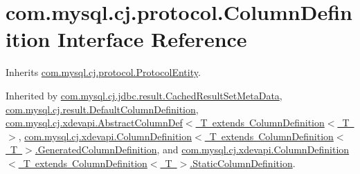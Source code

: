 \hypertarget{interfacecom_1_1mysql_1_1cj_1_1protocol_1_1_column_definition}{}\section{com.\+mysql.\+cj.\+protocol.\+Column\+Definition Interface Reference}
\label{interfacecom_1_1mysql_1_1cj_1_1protocol_1_1_column_definition}


Inherits \mbox{\hyperlink{interfacecom_1_1mysql_1_1cj_1_1protocol_1_1_protocol_entity}{com.\+mysql.\+cj.\+protocol.\+Protocol\+Entity}}.



Inherited by \mbox{\hyperlink{interfacecom_1_1mysql_1_1cj_1_1jdbc_1_1result_1_1_cached_result_set_meta_data}{com.\+mysql.\+cj.\+jdbc.\+result.\+Cached\+Result\+Set\+Meta\+Data}}, \mbox{\hyperlink{classcom_1_1mysql_1_1cj_1_1result_1_1_default_column_definition}{com.\+mysql.\+cj.\+result.\+Default\+Column\+Definition}}, \mbox{\hyperlink{classcom_1_1mysql_1_1cj_1_1xdevapi_1_1_abstract_column_def}{com.\+mysql.\+cj.\+xdevapi.\+Abstract\+Column\+Def$<$ T extends Column\+Definition$<$ T $>$}}, \mbox{\hyperlink{interfacecom_1_1mysql_1_1cj_1_1xdevapi_1_1_column_definition_1_1_generated_column_definition}{com.\+mysql.\+cj.\+xdevapi.\+Column\+Definition$<$ T extends Column\+Definition$<$ T $>$.\+Generated\+Column\+Definition}}, and \mbox{\hyperlink{interfacecom_1_1mysql_1_1cj_1_1xdevapi_1_1_column_definition_1_1_static_column_definition}{com.\+mysql.\+cj.\+xdevapi.\+Column\+Definition$<$ T extends Column\+Definition$<$ T $>$.\+Static\+Column\+Definition}}.

